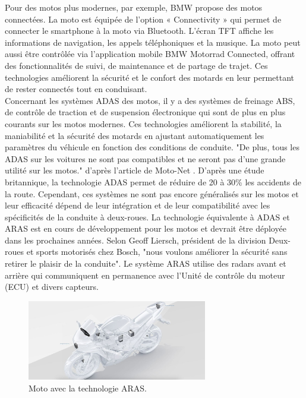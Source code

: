 Pour des motos plus modernes, par exemple, BMW propose des motos connectées\cite{bmw_adas}. La moto est équipée de l’option « Connectivity » qui permet de connecter le smartphone à la moto via Bluetooth. L’écran TFT affiche les informations de navigation, les appels téléphoniques et la musique. La moto peut aussi être contrôlée via l’application mobile BMW Motorrad Connected, offrant des fonctionnalités de suivi, de maintenance et de partage de trajet. Ces technologies améliorent la sécurité et le confort des motards en leur permettant de rester connectés tout en conduisant.\\
Concernant les systèmes ADAS des motos\cite{moto_adas}, il y a des systèmes de freinage ABS, de contrôle de traction et de suspension électronique qui sont de plus en plus courants sur les motos modernes. Ces technologies améliorent la stabilité, la maniabilité et la sécurité des motards en ajustant automatiquement les paramètres du véhicule en fonction des conditions de conduite. "De plus, tous les ADAS sur les voitures ne sont pas compatibles et ne seront pas d’une grande utilité sur les motos." d'après l'article de Moto-Net \cite{moto_adas}.
D'après une étude britannique, la technologie ADAS permet de réduire de 20 à 30\%\cite{moto_aras} les accidents de la route. Cependant, ces systèmes ne sont pas encore généralisés sur les motos et leur efficacité dépend de leur intégration et de leur compatibilité avec les spécificités de la conduite à deux-roues. La technologie équivalente à ADAS et ARAS est en cours de développement pour les motos et devrait être déployée dans les prochaines années.
Selon Geoff Liersch, président de la division Deux-roues et sports motorisés chez Bosch, "nous voulons améliorer la sécurité sans retirer le plaisir de la conduite"\cite{aras_bosh}.
Le système ARAS utilise des radars avant et arrière qui communiquent en permanence avec l’Unité de contrôle du moteur (ECU) et divers capteurs.

\begin{figure}[H]
    \centering
    \includegraphics[width=0.7\textwidth]{images/aras_moto.jpeg} 
    \caption{Moto avec la technologie ARAS.}
\end{figure}

